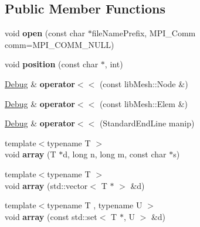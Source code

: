 \subsection*{Public Member Functions}
\begin{DoxyCompactItemize}
\item 
\hypertarget{class_debug_a20fb0d2a4f48ea6aba6c2303794837e0}{void {\bfseries open} (const char $\ast$file\-Name\-Prefix, M\-P\-I\-\_\-\-Comm comm=M\-P\-I\-\_\-\-C\-O\-M\-M\-\_\-\-N\-U\-L\-L)}\label{class_debug_a20fb0d2a4f48ea6aba6c2303794837e0}

\item 
\hypertarget{class_debug_a58a162758ce93f408bbaa70e3489e40f}{void {\bfseries position} (const char $\ast$, int)}\label{class_debug_a58a162758ce93f408bbaa70e3489e40f}

\item 
\hypertarget{class_debug_ae9967139f3da2c6e151265790eef1fc5}{\hyperlink{class_debug}{Debug} \& {\bfseries operator$<$$<$} (const lib\-Mesh\-::\-Node \&)}\label{class_debug_ae9967139f3da2c6e151265790eef1fc5}

\item 
\hypertarget{class_debug_a2e65ef865e0b52b6f6cb906b08df5a58}{\hyperlink{class_debug}{Debug} \& {\bfseries operator$<$$<$} (const lib\-Mesh\-::\-Elem \&)}\label{class_debug_a2e65ef865e0b52b6f6cb906b08df5a58}

\item 
\hypertarget{class_debug_a79184450d80f33bf78ac7d2fa9734492}{\hyperlink{class_debug}{Debug} \& {\bfseries operator$<$$<$} (Standard\-End\-Line manip)}\label{class_debug_a79184450d80f33bf78ac7d2fa9734492}

\item 
\hypertarget{class_debug_a81493a3be55e4a16bb152fc90a9dc56d}{{\footnotesize template$<$typename T $>$ }\\void {\bfseries array} (T $\ast$d, long n, long m, const char $\ast$s)}\label{class_debug_a81493a3be55e4a16bb152fc90a9dc56d}

\item 
\hypertarget{class_debug_a558bef398b4c903c758b8723a6dfcb81}{{\footnotesize template$<$typename T $>$ }\\void {\bfseries array} (std\-::vector$<$ T $\ast$ $>$ \&d)}\label{class_debug_a558bef398b4c903c758b8723a6dfcb81}

\item 
\hypertarget{class_debug_a43ac85062bc49da2b9a6317593daf244}{{\footnotesize template$<$typename T , typename U $>$ }\\void {\bfseries array} (const std\-::set$<$ T $\ast$, U $>$ \&d)}\label{class_debug_a43ac85062bc49da2b9a6317593daf244}


\end{DoxyCompactItemize}
